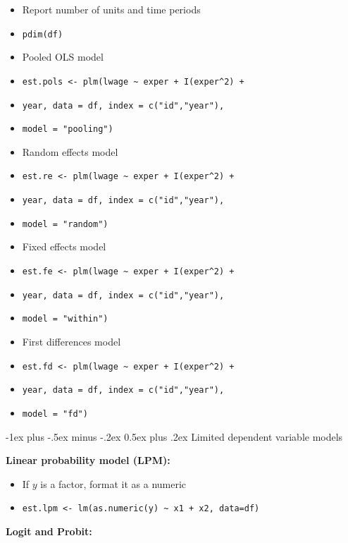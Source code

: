 \documentclass[10pt,landscape]{article}
\makeatletter
\renewcommand{\section}{\@startsection{section}{1}{0mm}%
                                {-1ex plus -.5ex minus -.2ex}%
                                {0.5ex plus .2ex}%
                                {\normalfont\large\bfseries}}
\makeatother
\begin{document}
\begin{multicols}{3}
\begin{itemize}
    \item Report number of units and time periods
    \item[] \verb!pdim(df)!
    \item Pooled OLS model
    \item[] \verb!est.pols <- plm(lwage ~ exper + I(exper^2) +! 
    \item[] \verb!year, data = df, index = c("id","year"),! 
    \item[] \verb!model = "pooling")!
    \item Random effects model
    \item[] \verb!est.re <- plm(lwage ~ exper + I(exper^2) +! 
    \item[] \verb!year, data = df, index = c("id","year"),! 
    \item[] \verb!model = "random")!
    \item Fixed effects model
    \item[] \verb!est.fe <- plm(lwage ~ exper + I(exper^2) +! 
    \item[] \verb!year, data = df, index = c("id","year"),! 
    \item[] \verb!model = "within")!
    \item First differences model
    \item[] \verb!est.fd <- plm(lwage ~ exper + I(exper^2) +! 
    \item[] \verb!year, data = df, index = c("id","year"),! 
    \item[] \verb!model = "fd")!
\end{itemize}




\section{Limited dependent variable models}

\smallskip{}

\textbf{Linear probability model (LPM):}\\
\begin{itemize}
    \item If $y$ is a factor, format it as a numeric
    \item[] \verb!est.lpm <- lm(as.numeric(y) ~ x1 + x2, data=df)!
\end{itemize}

\textbf{Logit and Probit:}\\


\end{multicols}
\end{document}
